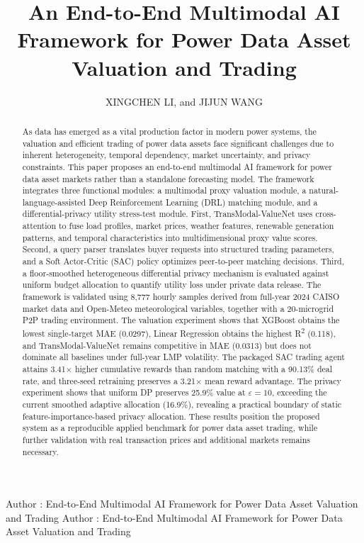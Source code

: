 \documentclass{ieeeaccess}
\begin{document}
\doi{}

\title{An End-to-End Multimodal AI Framework for Power Data Asset Valuation and Trading}
\author{\uppercase{Xingchen Li}, and \uppercase{Jijun Wang}}
\address[1]{Affiliation to be added before submission (e-mail: to be added)}
\address[2]{Affiliation to be added before submission (e-mail: to be added)}

\markboth
{Author \headeretal: End-to-End Multimodal AI Framework for Power Data Asset Valuation and Trading}
{Author \headeretal: End-to-End Multimodal AI Framework for Power Data Asset Valuation and Trading}


\begin{abstract}
As data has emerged as a vital production factor in modern power systems, the valuation and efficient trading of power data assets face significant challenges due to inherent heterogeneity, temporal dependency, market uncertainty, and privacy constraints. This paper proposes an end-to-end multimodal AI framework for power data asset markets rather than a standalone forecasting model. The framework integrates three functional modules: a multimodal proxy valuation module, a natural-language-assisted Deep Reinforcement Learning (DRL) matching module, and a differential-privacy utility stress-test module. First, TransModal-ValueNet uses cross-attention to fuse load profiles, market prices, weather features, renewable generation patterns, and temporal characteristics into multidimensional proxy value scores. Second, a query parser translates buyer requests into structured trading parameters, and a Soft Actor-Critic (SAC) policy optimizes peer-to-peer matching decisions. Third, a floor-smoothed heterogeneous differential privacy mechanism is evaluated against uniform budget allocation to quantify utility loss under private data release. The framework is validated using 8,777 hourly samples derived from full-year 2024 CAISO market data and Open-Meteo meteorological variables, together with a 20-microgrid P2P trading environment. The valuation experiment shows that XGBoost obtains the lowest single-target MAE (0.0297), Linear Regression obtains the highest R\textsuperscript{2} (0.118), and TransModal-ValueNet remains competitive in MAE (0.0313) but does not dominate all baselines under full-year LMP volatility. The packaged SAC trading agent attains 3.41$\times$ higher cumulative rewards than random matching with a 90.13\% deal rate, and three-seed retraining preserves a 3.21$\times$ mean reward advantage. The privacy experiment shows that uniform DP preserves 25.9\% value at $\varepsilon = 10$, exceeding the current smoothed adaptive allocation (16.9\%), revealing a practical boundary of static feature-importance-based privacy allocation. These results position the proposed system as a reproducible applied benchmark for power data asset trading, while further validation with real transaction prices and additional markets remains necessary.
\end{abstract}
\end{document}
